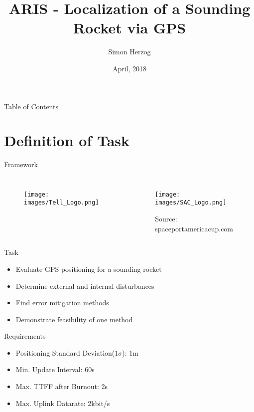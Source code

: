 \documentclass[12pt, compress, xcolor=table]{beamer}
\title{ARIS - Localization of a Sounding Rocket via GPS}
\author{Simon Herzog}
\institute{Interim Presentation Bachelor Thesis}
\date{April, 2018}
\begin{document}
\maketitle

\begin{frame}{Table of Contents}
 \tableofcontents
\end{frame}


\section{Definition of Task}

\begin{frame}{Framework}
 \begin{columns}
  \begin{figure}
  \centering
   \texttt{[image: images/Tell\_Logo.png]}
  \end{figure}
  
  \begin{figure}
   \centering
   \texttt{[image: images/SAC\_Logo.png]}
   \caption*{Source: spaceportamericacup.com}
  \end{figure}
  
 \end{columns}
\end{frame}

\begin{frame}{Task}
 \begin{itemize}
  \setlength\itemsep{0.5cm}
  \item Evaluate GPS positioning for a sounding rocket
  \item Determine external and internal disturbances
  \item Find error mitigation methods
  \item Demonstrate feasibility of one method
 \end{itemize}
\end{frame}

\begin{frame}{Requirements}
 \begin{itemize}
  \setlength\itemsep{0.5cm}
  \item Positioning Standard Deviation($1\sigma$): 1m \\[30pt]
  \item Min. Update Interval: 60s
  \item Max. TTFF after Burnout: 2s
  \item Max. Uplink Datarate: 2kbit/s
 \end{itemize}
\end{frame}
\end{document}
